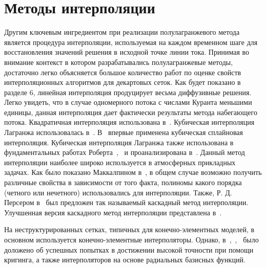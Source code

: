 \section*{Методы интерполяции} \label{sect5_2}
Другим ключевым ингредиентом при реализации полулагранжевого метода является процедура интерполяции, используемая на каждом временном шаге для восстановления значений решения в исходной точке линии тока. Принимая во внимание контекст в котором разрабатывались полулагранжевые методы, достаточно легко объясняется большое количество работ по оценке свойств интерполяционных алгоритмов для декартовых сеток. Как будет показано в разделе 6, линейная интерполяция продуцирует весьма диффузивные решения. 
Легко увидеть, что в случае одномерного потока с числами Куранта меньшими единицы, данная интерполяция дает фактически результаты метода набегающего потока. Квадратичная интерполяция использована в~\cite{A3}. Кубическая  интерполяция Лагранжа использовалась в~\cite{A63}. В~\cite{A53} впервые применена кубическая сплайновая интерполяция. Кубическая интерполяция Лагранжа также использована в фундаментальных работах Роберта~\cite{A59},~\cite{A60} и проанализирована в~\cite{A52}. Данный метод интерполяции наиболее широко используется в атмосферных прикладных задачах. Как было показано Маккалпином в~\cite{A37}, в общем случае возможно получить различные свойства в зависимости от того факта, полиномы какого порядка (четного или нечетного) использовались для интерполяции. Также, Р. Д. Персером в~\cite{A54} был предложен так называемый каскадный метод интерполяции. Улучшенная версия каскадного метод интерполяции представлена в~\cite{A46}.

На неструктурированных сетках, типичных для конечно-элементных моделей, в основном используется конечно-элементные интерполяторы. Однако, в~\cite{A61},~\cite{A62},~\cite{A4} было доложено об успешных попытках в достижении высокой точности при помощи кригинга, а также интерполяторов на основе радиальных базисных функций.


